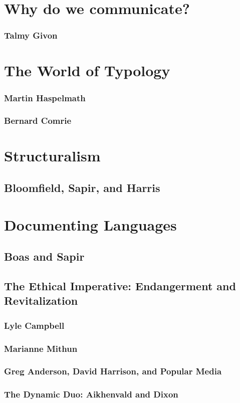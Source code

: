 

\section{Why do we communicate?} 


\subsubsection{Talmy Givon}

\section{The World of Typology}
\subsubsection{Martin Haspelmath}
\subsubsection{Bernard Comrie}

\section{Structuralism}
\subsection{Bloomfield, Sapir, and Harris}

\section{Documenting Languages}
\subsection{Boas and Sapir}
\subsection{The Ethical Imperative: Endangerment and Revitalization}
\subsubsection{Lyle Campbell}
\subsubsection{Marianne Mithun}
\subsubsection{Greg Anderson, David Harrison, and Popular Media}
\subsubsection{The Dynamic Duo: Aikhenvald and Dixon}
\subsubsection{}
\subsubsection{}








